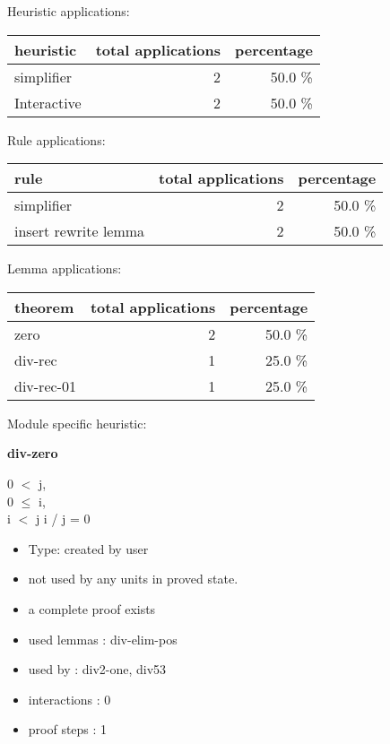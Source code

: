 \documentclass[a4paper]{article}
\begin{document}
\medskip


Heuristic applications:

\begin{supertabular}{l|r|r}
heuristic	& total applications & percentage \\ \hline
simplifier & 2 & 50.0 \% \\
Interactive & 2 & 50.0 \% \\

\end{supertabular}

Rule applications:

\begin{supertabular}{l|r|r}
rule	        & total applications & percentage \\ \hline
simplifier & 2 & 50.0 \% \\
insert rewrite lemma & 2 & 50.0 \% \\

\end{supertabular}

Lemma applications:

\begin{supertabular}{l|r|r}
theorem	        & total applications & percentage \\ \hline
zero & 2 & 50.0 \% \\
div-rec & 1 & 25.0 \% \\
div-rec-01 & 1 & 25.0 \% \\

\end{supertabular}

Module specific heuristic:

\pagebreak

{\LARGE\bf div-zero}\label{lemma-div-zero}

\medskip

0 $<$ j, \\
0 $\le$ i, \\
i $<$ j \Fol i / j = 0

\begin{itemize}

\item Type: created by user

\item not used by any units in proved state.
\item       a complete proof exists
\item       used lemmas  : div-elim-pos
\item       used by      : div2-one, div53
\item       interactions : 0
\item       proof steps  : 1
\end{itemize}
\end{document}
